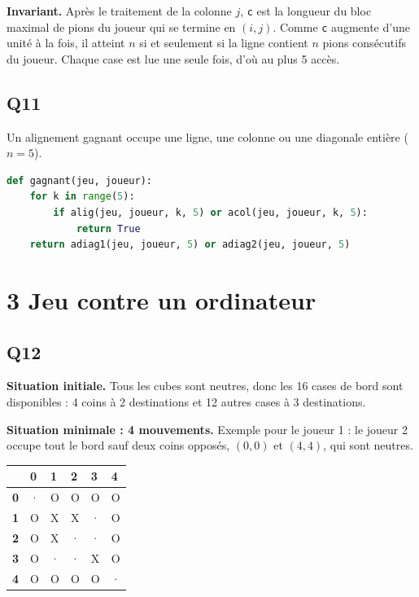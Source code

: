 \documentclass[11pt,a4paper]{article}
\newcommand{\equationajustee}[1]{%
  \sbox{\boiteequation}{$\displaystyle #1$}%
  \ifdim\wd\boiteequation>\linewidth
    \[\resizebox{\linewidth}{!}{\usebox{\boiteequation}}\]%
  \else
    \[#1\]%
  \fi}
\begin{document}
\textbf{Invariant.} Après le traitement de la colonne \(j\), \texttt{c} est la longueur du bloc maximal de pions du joueur qui se termine en \((i,j)\). Comme \texttt{c} augmente d'une unité à la fois, il atteint \(n\) si et seulement si la ligne contient \(n\) pions consécutifs du joueur. Chaque case est lue une seule fois, d'où au plus 5 accès.

\hypertarget{q11}{%
\subsection{Q11}\label{q11}}

Un alignement gagnant occupe une ligne, une colonne ou une diagonale entière (\(n=5\)).

\begin{lstlisting}[language=Python]
def gagnant(jeu, joueur):
    for k in range(5):
        if alig(jeu, joueur, k, 5) or acol(jeu, joueur, k, 5):
            return True
    return adiag1(jeu, joueur, 5) or adiag2(jeu, joueur, 5)
\end{lstlisting}

\hypertarget{jeu-contre-un-ordinateur}{%
\section{3 Jeu contre un ordinateur}\label{jeu-contre-un-ordinateur}}

\hypertarget{q12}{%
\subsection{Q12}\label{q12}}

\textbf{Situation initiale.} Tous les cubes sont neutres, donc les 16 cases de bord sont disponibles : 4 coins à 2 destinations et 12 autres cases à 3 destinations.
\equationajustee{\boxed{4\times2+12\times3=44\ \text{mouvements.}}}

\textbf{Situation minimale : 4 mouvements.} Exemple pour le joueur 1 : le joueur 2 occupe tout le bord sauf deux coins opposés, \((0,0)\) et \((4,4)\), qui sont neutres.

\begin{longtable}[]{@{}llllll@{}}
\toprule\noalign{}
& 0 & 1 & 2 & 3 & 4 \\
\midrule\noalign{}
\endhead
\bottomrule\noalign{}
\endlastfoot
\textbf{0} & · & O & O & O & O \\
\textbf{1} & O & X & X & · & O \\
\textbf{2} & O & X & · & · & O \\
\textbf{3} & O & · & · & X & O \\
\textbf{4} & O & O & O & O & · \\
\end{longtable}
\end{document}
